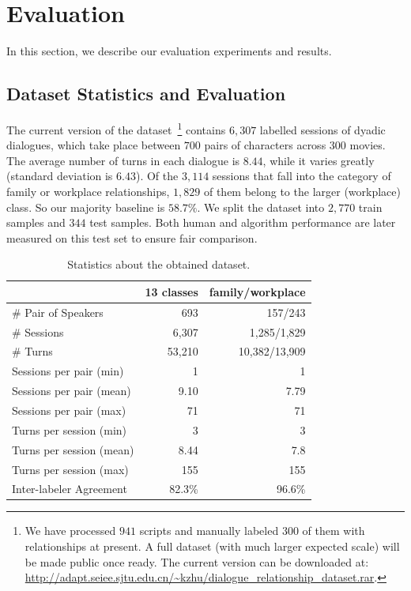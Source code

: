 \section {Evaluation}
\label{sec:eval}
In this section, we describe our evaluation experiments and results.

\subsection{Dataset Statistics and Evaluation}
\label{subsec:human baseline}

The current version of the dataset~\footnote{We have processed $941$ scripts and 
manually labeled $300$ of them with relationships at present.
 A full dataset (with much larger expected scale) will be made 
public once ready. The current version can be downloaded at: 
\url{http://adapt.seiee.sjtu.edu.cn/~kzhu/dialogue_relationship_dataset.rar}.}
contains $6,307$ labelled sessions of dyadic dialogues, 
which take place between $700$ pairs of characters across $300$ movies. 
The average number of turns in each dialogue is $8.44$, 
while it varies greatly (standard deviation is $6.43$). 
Of the $3,114$ sessions that fall into the category of family or 
workplace relationships, $1,829$ of them belong to the larger (workplace) class. 
So our majority baseline is $58.7\%$. We split the dataset into $2,770$ train samples and $344$ test samples. Both human and algorithm performance are later measured on this test set to ensure fair comparison. 
\begin{table}[h!]
	\centering
	\small
	\begin{tabular}{@{}lrr@{}}
		\toprule
		\textbf{}                & 13 classes & family/workplace \\ \midrule
		\# Pair of Speakers      & 693        & 157/243             \\
		\# Sessions              & 6,307       & 1,285/1,829        \\
		\# Turns                 & 53,210     & 10,382/13,909           \\
		Sessions per pair (min)  & 1          & 1                \\
		Sessions per pair (mean) & 9.10       & 7.79             \\
		Sessions per pair (max)  & 71         & 71               \\
		Turns per session (min)  & 3          & 3                \\
		Turns per session (mean) & 8.44       & 7.8              \\
		Turns per session (max)  & 155        & 155              \\\midrule
		Inter-labeler Agreement & 82.3\%     & 96.6\%           \\ \bottomrule
	\end{tabular}
	\caption{Statistics about the obtained dataset.}\label{table:dataset}
\end{table}


